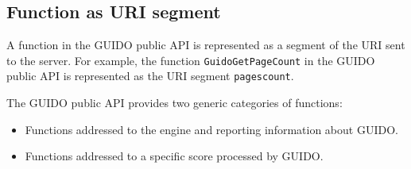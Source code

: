 \documentclass[11pt,a4paper]{article}
\begin{document}
\subsection{Function as URI segment}
A function in the GUIDO public API is represented as a segment of the URI sent to the server.  For example, the function \verb=GuidoGetPageCount= in the GUIDO public API is represented as the URI segment \verb=pagescount=.\par
The GUIDO public API provides two generic categories of functions:
\begin{itemize}[noitemsep]
\item Functions addressed to the engine and reporting information about GUIDO.
\item Functions addressed to a specific score processed by GUIDO.
\end{itemize}
\end{document}
